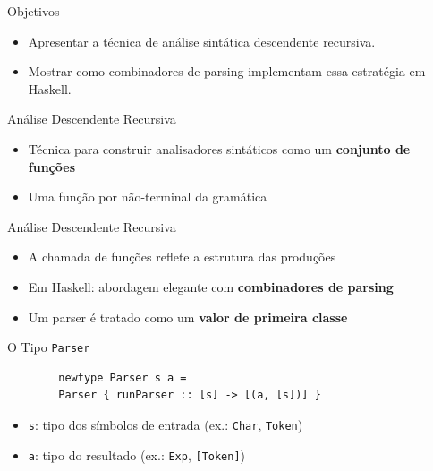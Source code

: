 \subtitle{\bf Aula 6 - Análise Descendente}
\begin{frame}[t,plain]
    \titlepage
\end{frame}

\begin{frame}{Objetivos}

    \begin{itemize}
        \item
        Apresentar a técnica de análise sintática descendente recursiva.
        \item
        Mostrar como combinadores de parsing implementam essa estratégia em
        Haskell.
    \end{itemize}
\end{frame}



\begin{frame}{Análise Descendente Recursiva}

    \begin{itemize}

        \item
        Técnica para construir analisadores sintáticos como um
        \textbf{conjunto de funções}
        \item
        Uma função por não-terminal da gramática
    \end{itemize}
\end{frame}

\begin{frame}{Análise Descendente Recursiva}

    \begin{itemize}

        \item
        A chamada de funções reflete a estrutura das produções
        \item
        Em Haskell: abordagem elegante com \textbf{combinadores de parsing}
        \item
        Um parser é tratado como um \textbf{valor de primeira classe}
    \end{itemize}
\end{frame}

\begin{frame}[fragile]{O Tipo \texttt{Parser}}

    \begin{lstlisting}
        newtype Parser s a =
        Parser { runParser :: [s] -> [(a, [s])] }
    \end{lstlisting}

    \begin{itemize}

        \item
        \texttt{s}: tipo dos símbolos de entrada (ex.:
        \texttt{Char}, \texttt{Token})
        \item
        \texttt{a}: tipo do resultado (ex.:
        \texttt{Exp}, \texttt{[Token]})
    \end{itemize}
\end{frame}

